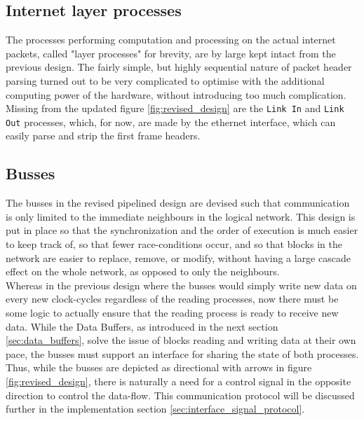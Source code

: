 \subsection{Internet layer processes} \label{sec:layer_processes}
The processes performing computation and processing on the actual internet 
packets, called "layer processes" for brevity, are by large kept intact from the 
previous design. The fairly simple, but highly sequential nature of packet 
header parsing turned out to be very complicated to optimise with the additional
computing power of the hardware, without introducing too much complication.\\
Missing from the updated figure \ref{fig:revised_design} are the \texttt{Link In}
and \texttt{Link Out} processes, which, for now, are made by the ethernet 
interface, which can easily parse and strip the first frame headers.

\subsection{Busses}
The busses in the revised pipelined design are devised such that communication 
is only limited to the immediate neighbours in the logical network. This design
is put in place so that the synchronization and the order of execution is much 
easier to keep track of, so that fewer race-conditions occur, and so that blocks 
in the network are easier to replace, remove, or modify, without having a large
cascade effect on the whole network, as opposed to only the neighbours.\\
Whereas in the previous design where the busses would simply write new data on
every new clock-cycles regardless of the reading processes, now there must be 
some logic to actually ensure that the reading process is ready to receive new 
data. While the Data Buffers, as introduced in the next section \ref{sec:data_buffers},
solve the issue of blocks reading and writing data at their own pace, the busses
must support an interface for sharing the state of both processes. Thus, while 
the busses are depicted as directional with arrows in figure \ref{fig:revised_design},
there is naturally a need for a control signal in the opposite direction to 
control the data-flow. This communication protocol will be discussed further in 
the implementation section \ref{sec:interface_signal_protocol}.


